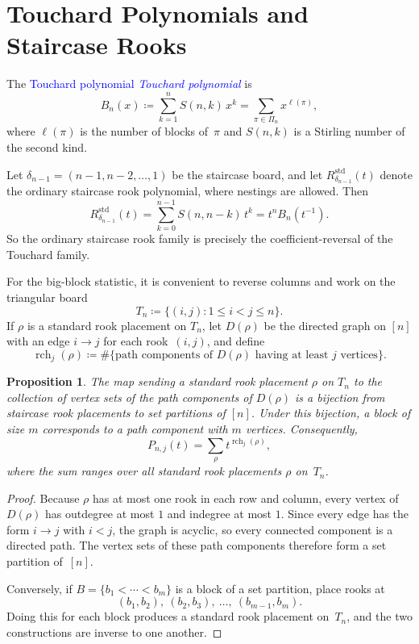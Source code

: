 \documentclass[11pt,reqno]{amsart}
\newtheorem{proposition}[theorem]{Proposition}
\theoremstyle{definition}
\newcommand{\defin}[1]{%
\relax\ifmmode%
\textcolor{blue}{#1}%
\else \textcolor{blue}{\emph{#1}}%
\fi%
}
\begin{document}
\section{Touchard Polynomials and Staircase Rooks}

The \defin{Touchard polynomial} is
\[
  B_n(x)
  \coloneqq
  \sum_{k=1}^{n} S(n,k)\,x^k
  =
  \sum_{\pi \in \Pi_n} x^{\ell(\pi)},
\]
where $\ell(\pi)$ is the number of blocks of~$\pi$ and $S(n,k)$ is a
Stirling number of the second kind.

Let $\delta_{n-1}=(n-1,n-2,\dotsc,1)$ be the staircase board, and let
$R_{\delta_{n-1}}^{\mathrm{std}}(t)$ denote the ordinary staircase rook
polynomial, where nestings are allowed. Then
\[
  R_{\delta_{n-1}}^{\mathrm{std}}(t)
  =
  \sum_{k=0}^{n-1} S(n,n-k)\,t^k
  =
  t^n B_n(t^{-1}).
\]
So the ordinary staircase rook family is precisely the coefficient-reversal of
the Touchard family.

For the big-block statistic, it is convenient to reverse columns and work on
the triangular board
\[
  T_n \coloneqq \{(i,j) : 1 \leq i < j \leq n\}.
\]
If $\rho$ is a standard rook placement on $T_n$, let $D(\rho)$ be the
directed graph on $[n]$ with an edge $i \to j$ for each rook~$(i,j)$, and
define
\[
  \operatorname{rch}_j(\rho)
  \coloneqq
  \#\{\text{path components of $D(\rho)$ having at least $j$ vertices}\}.
\]

\begin{proposition}\label{prop:touchard_rook_bijection}
The map sending a standard rook placement $\rho$ on $T_n$ to the collection of
vertex sets of the path components of $D(\rho)$ is a bijection from staircase
rook placements to set partitions of $[n]$. Under this bijection, a block of
size $m$ corresponds to a path component with $m$ vertices. Consequently,
\[
  P_{n,j}(t)
  =
  \sum_{\rho} t^{\operatorname{rch}_j(\rho)},
\]
where the sum ranges over all standard rook placements $\rho$ on~$T_n$.
\end{proposition}

\begin{proof}
Because $\rho$ has at most one rook in each row and column, every vertex of
$D(\rho)$ has outdegree at most $1$ and indegree at most $1$. Since every edge
has the form $i \to j$ with $i<j$, the graph is acyclic, so every connected
component is a directed path. The vertex sets of these path components
therefore form a set partition of~$[n]$.

Conversely, if $B=\{b_1<\dotsb<b_m\}$ is a block of a set partition, place
rooks at
\[
  (b_1,b_2),\ (b_2,b_3),\ \dotsc,\ (b_{m-1},b_m).
\]
Doing this for each block produces a standard rook placement on~$T_n$, and the
two constructions are inverse to one another.
\end{proof}
\end{document}
